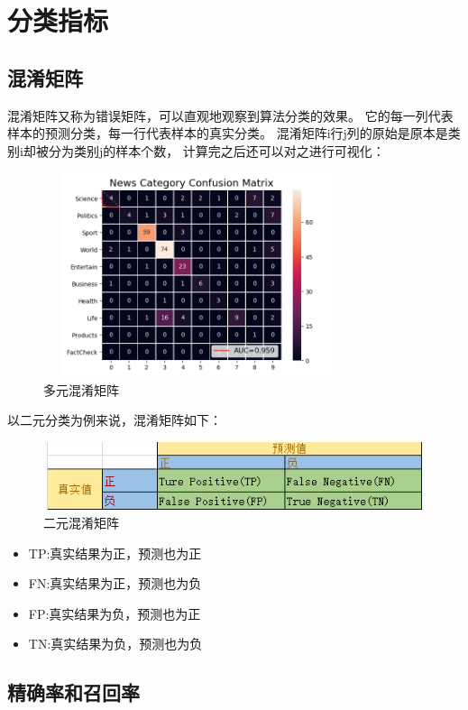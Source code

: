 \chapter{分类指标}

\section{混淆矩阵}
混淆矩阵又称为错误矩阵，可以直观地观察到算法分类的效果。
它的每一列代表样本的预测分类，每一行代表样本的真实分类。
混淆矩阵i行j列的原始是原本是类别i却被分为类别j的样本个数，
计算完之后还可以对之进行可视化：
\begin{figure}[h]
    \centering
    \includegraphics[width=9cm, height=6cm]{1_1.png}
    \caption{多元混淆矩阵}
\end{figure}

以二元分类为例来说，混淆矩阵如下：

\begin{figure}[h]
    \centering
    \includegraphics[width=12cm, height=2cm]{1_2.png}
    \caption{二元混淆矩阵}
\end{figure}

\begin{itemize}
    \item TP:真实结果为正，预测也为正
    \item FN:真实结果为正，预测也为负
    \item FP:真实结果为负，预测也为正
    \item TN:真实结果为负，预测也为负
\end{itemize}

\section{精确率和召回率}

